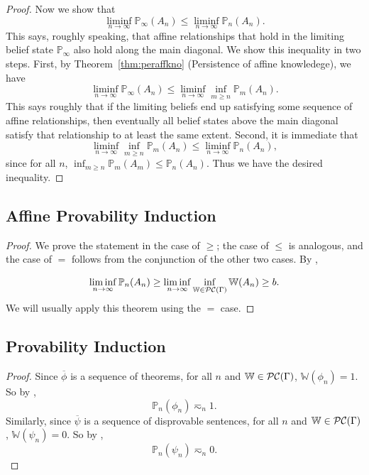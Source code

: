 \documentclass[authordate,onecolumn,noenvironments]{miri-tech-article}
\numberwithin{equation}{subsection}
\newcommand{\seq}[1]{{\overline{#1}}}
\newcommand{\nn}{n}
\newcommand{\aff}{A}
\newcommand{\BelState}{\mathbb{P}}
\newcommand{\pt}{\BelState}
\newcommand{\cworlds}{\mathcal{P\-C}} %
\newcommand{\World}{\mathbb{W}}
\newcommand{\Theory}{\Gamma}
\begin{document}
\begin{proof}
Now we show that 
%
\[ \liminf_{n \to\infty} \pt_{\infty}(\aff_{n}) \le \liminf_{n \to\infty} \pt_{\nn}(\aff_{\nn}). \]
%
This says, roughly speaking, that affine
relationships that hold in the limiting belief state $\pt_\infty$ also hold  along the main diagonal.  We show this inequality in two steps. 
First, by Theorem~\ref{thm:peraffkno} (Persistence of affine knowledege), we have 
%
\[ \liminf_{n \to\infty} \pt_{\infty}(\aff_{n}) \le  \liminf_{n \to\infty}\inf_{m \ge n} \pt_{m}(\aff_{n}). \]
%
This says roughly that if the limiting beliefs end up satisfying some sequence of affine relationships, then eventually all belief states above the main
diagonal satisfy that relationship to at least the same extent. Second, it is immediate that 
%
\[ \liminf_{n \to\infty}\inf_{m \ge n} \pt_{m}(\aff_{n}) \le \liminf_{n \to\infty}  \pt_{n}(\aff_{n}), \]
%
since for all $n$, 
$\inf_{m \ge n} \pt_{m}(\aff_{m}) \le \pt_{\nn}(\aff_{\nn})$. Thus we have the desired inequality. 
\end{proof}

\subsection{Affine Provability Induction}\label{app:affprovind}

\affprovind*

\begin{proof}
  We prove the statement in the case of $\geq$; the case of $\leq$ is analogous, and the case of $=$ follows from the conjunction of the other two cases.  By ,

  \[ \liminf_{n \to \infty} \pt_n(\aff_n) \geq \liminf_{n \to \infty} \inf_{\World \in \cworlds(\Theory)} \World(\aff_n) \geq b. \]
  We will usually apply this theorem using the $=$ case.
\end{proof}



\subsection{Provability Induction}\label{app:provind}

\restatepi*


\begin{proof}
  Since $\seq\phi$ is a sequence of theorems, for all $n$ and $\World \in \cworlds(\Theory)$, $\World(\phi_n) = 1$.  So by ,
  \[ \pt_n(\phi_n) \eqsim_n 1. \]
  Similarly, since $\seq\psi$ is a sequence of disprovable sentences, for all $n$ and $\World \in \cworlds(\Theory)$, $\World(\psi_n) = 0$.  So by ,
  \[ \pt_n(\psi_n) \eqsim_n 0. \]
\end{proof}
\end{document}
